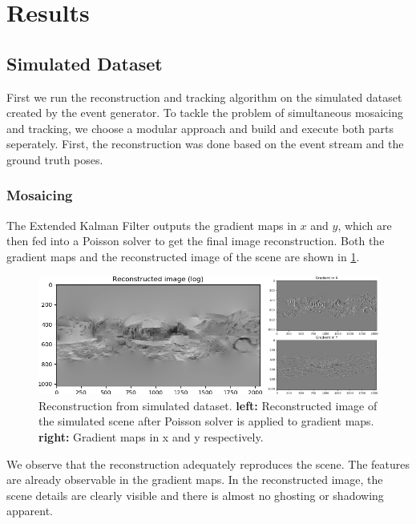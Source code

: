 \documentclass[10pt,twocolumn,letterpaper]{article}
\begin{document}
\section{Results}
\subsection{Simulated Dataset}
First we run the reconstruction and tracking algorithm on the simulated dataset created by the event generator. To tackle the problem of simultaneous mosaicing and tracking, we choose a modular approach and build and execute both parts seperately. First, the reconstruction was done based on the event stream and the ground truth poses. 

\subsubsection{Mosaicing}
The Extended Kalman Filter outputs the gradient maps in $x$ and $y$, which are then fed into a Poisson solver to get the final image reconstruction. Both the gradient maps and the reconstructed image of the scene are shown in \cref{fig:reconstruction_simulated}. 

\begin{figure}[h!]
	\centering
    \includegraphics[width=1.0\linewidth]{figures/reconstructed_and_gradient.png}   \caption{Reconstruction from simulated dataset. \textbf{left:} Reconstructed image of the simulated scene after Poisson solver is applied to gradient maps. \textbf{right:} Gradient maps in x and y respectively.}
    \label{fig:reconstruction_simulated}
\end{figure}

We observe that the reconstruction adequately reproduces the scene. The features are already observable in the gradient maps. In the reconstructed image, the scene details are clearly visible and there is almost no ghosting or shadowing apparent. 
\end{document}

